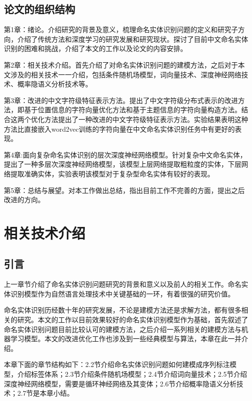 \documentclass[winfonts,master,oneside,nobackinfo]{njuthesis}
\begin{document}
\section{论文的组织结构}
第1章：绪论。介绍研究的背景及意义，梳理命名实体识别问题的定义和研究子方向，介绍了传统方法和深度学习的研究发展和研究现状。探讨了目前中文命名实体识别的困难和挑战，介绍了本文的工作以及论文的内容安排。

第2章：相关技术介绍。首先介绍了对命名实体识别问题的建模方法，之后对于本文涉及的相关技术一一介绍，包括条件随机场模型，词向量技术、深度神经网络技术、概率隐语义分析技术等。

第3章：改进的中文字符级特征表示方法。提出了中文字符级分布式表示的改进方法，即基于位置信息的字符向量优化方法和基于主题信息的字符向量构造方法。结合这两个优化方法提出了一种改进的中文字符级特征表示方法。实验结果表明这种方法比直接嵌入word2vec训练的字符向量在中文命名实体识别任务中有更好的表现。

第4章:面向复杂命名实体识别的层次深度神经网络模型。针对复杂中文命名实体，提出了一种多层次深度神经网络模型，该模型上层网络提取粗粒度的实体，下层网络提取准确实体，实验表明该模型对于复杂型命名实体有较好的表现。

第5章：总结与展望。对本工作做出总结，指出目前工作不完善的方面，提出之后改进的方向。

\chapter{相关技术介绍}

\section{引言}
上一章节介绍了命名实体识别问题研究的背景和意义以及前人的相关工作。命名实体识别模型作为自然语言处理技术中关键基础的一环，有着很强的研究价值。

命名实体识别历经数十年的研究发展，不论是建模方法还是求解方法，都有很多相关的研究。本文的工作以目前效果较好的命名实体识别模型作为基础，首先叙述了命名实体识别问题目前比较认可的建模方法，之后介绍一系列相关的建模方法与机器学习模型。本文的改进优化工作也涉及到一些经典模型与算法，本章在此一并介绍。

本章下面的章节结构如下：2.2节介绍命名实体识别问题如何建模成序列标注模型，介绍标签体系；2.3节介绍条件随机场模型；2.4节介绍词向量技术；2.5节介绍深度神经网络模型，需要是循环神经网络及其变体；2.6节介绍概率隐语义分析技术；2.7节是本章小结。
\end{document}
